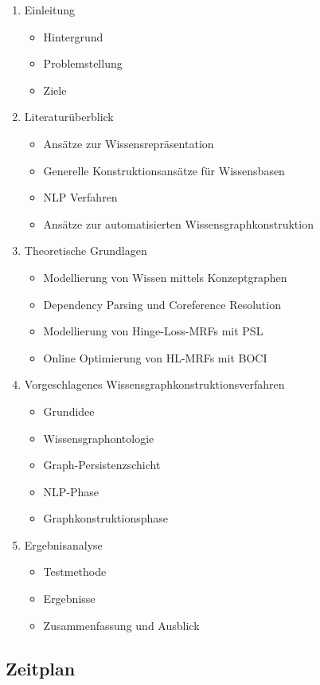 \documentclass[11pt, a4paper]{scrreprt}
\begin{document}
\begin{enumerate}
	\item Einleitung
		\begin{itemize}
			\item Hintergrund
			\item Problemstellung
			\item Ziele
		\end{itemize}
	\item Literaturüberblick
		\begin{itemize}
			\item Ansätze zur Wissensrepräsentation
			\item Generelle Konstruktionsansätze für Wissensbasen
			\item NLP Verfahren
			\item Ansätze zur automatisierten Wissensgraphkonstruktion
		\end{itemize}
	\item Theoretische Grundlagen
		\begin{itemize}
			\item Modellierung von Wissen mittels Konzeptgraphen
			\item Dependency Parsing und Coreference Resolution
			\item Modellierung von Hinge-Loss-MRFs mit PSL
			\item Online Optimierung von HL-MRFs mit BOCI
		\end{itemize}
	\item Vorgeschlagenes Wissensgraphkonstruktionsverfahren
		\begin{itemize}
			\item Grundidee
			\item Wissensgraphontologie
			\item Graph-Persistenzschicht
			\item NLP-Phase
			\item Graphkonstruktionsphase
		\end{itemize}
	\item Ergebnisanalyse
		\begin{itemize}
			\item Testmethode
			\item Ergebnisse
			\item Zusammenfassung und Ausblick
		\end{itemize}
\end{enumerate}

\subsection{Zeitplan}
\end{document}
